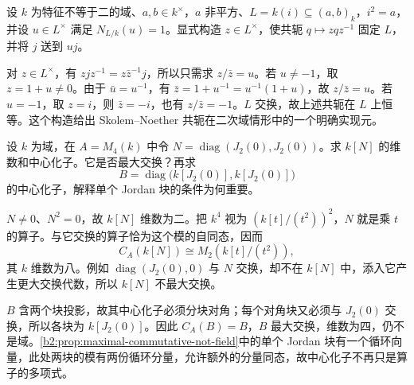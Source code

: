 \begin{exercise}\label{b2:ex:17-explicit-quadratic-conjugator}
	设 \(k\) 为特征不等于二的域、\(a,b\in k^\times\)，\(a\) 非平方、\(L=k(i)\subseteq(a,b)_k\)，\(i^2=a\)，并设 \(u\in L^\times\) 满足 \(N_{L/k}(u)=1\)。显式构造 \(z\in L^\times\)，使共轭 \(q\mapsto zqz^{-1}\) 固定 \(L\)，并将 \(j\) 送到 \(uj\)。
\end{exercise}
\begin{solution}
	对 \(z\in L^\times\)，有 \(zjz^{-1}=z\bar z^{-1}j\)，所以只需求 \(z/\bar z=u\)。若 \(u\ne-1\)，取 \(z=1+u\ne0\)。由于 \(\bar u=u^{-1}\)，有 \(\bar z=1+u^{-1}=u^{-1}(1+u)\)，故 \(z/\bar z=u\)。若 \(u=-1\)，取 \(z=i\)，则 \(\bar z=-i\)，也有 \(z/\bar z=-1\)。\(L\) 交换，故上述共轭在 \(L\) 上恒等。这个构造给出 Skolem–Noether 共轭在二次域情形中的一个明确实现元。
\end{solution}

\begin{exercise}\label{b2:ex:17-nilpotent-maximal-commutative}
	设 \(k\) 为域，在 \(A=M_4(k)\) 中令 \(N=\operatorname{diag}(J_2(0),J_2(0))\)。求 \(k[N]\) 的维数和中心化子。它是否最大交换？再求
	\[
		B=\operatorname{diag}\bigl(k[J_2(0)],k[J_2(0)]\bigr)
	\]
	的中心化子，解释单个 Jordan 块的条件为何重要。
\end{exercise}
\begin{solution}
	\(N\ne0\)、\(N^2=0\)，故 \(k[N]\) 维数为二。把 \(k^4\) 视为 \((k[t]/(t^2))^2\)，\(N\) 就是乘 \(t\) 的算子。与它交换的算子恰为这个模的自同态，因而
	\[
		C_A(k[N])\cong M_2(k[t]/(t^2)),
	\]
	其 \(k\) 维数为八。例如 \(\operatorname{diag}(J_2(0),0)\) 与 \(N\) 交换，却不在 \(k[N]\) 中，添入它产生更大交换代数，所以 \(k[N]\) 不最大交换。

	\(B\) 含两个块投影，故其中心化子必须分块对角；每个对角块又必须与 \(J_2(0)\) 交换，所以各块为 \(k[J_2(0)]\)。因此 \(C_A(B)=B\)，\(B\) 最大交换，维数为四，仍不是域。\cref{b2:prop:maximal-commutative-not-field}中的单个 Jordan 块有一个循环向量，此处两块的模有两份循环分量，允许额外的分量同态，故中心化子不再只是算子的多项式。
\end{solution}
